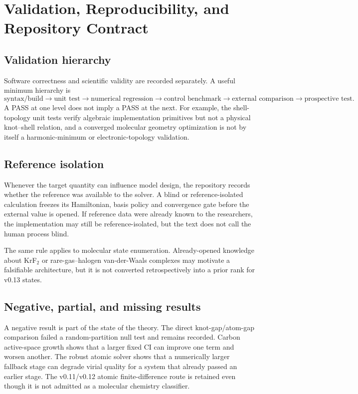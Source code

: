 \chapter{Validation, Reproducibility, and Repository Contract}
\label{app:validation}

\section{Validation hierarchy}
Software correctness and scientific validity are recorded separately.  A useful minimum hierarchy is
\begin{equation}
\text{syntax/build}\rightarrow\text{unit test}\rightarrow\text{numerical regression}\rightarrow\text{control benchmark}\rightarrow\text{external comparison}\rightarrow\text{prospective test}.
\end{equation}
A PASS at one level does not imply a PASS at the next.  For example, the shell-topology unit tests verify algebraic implementation primitives but not a physical knot--shell relation, and a converged molecular geometry optimization is not by itself a harmonic-minimum or electronic-topology validation.

\section{Reference isolation}
Whenever the target quantity can influence model design, the repository records whether the reference was available to the solver.  A blind or reference-isolated calculation freezes its Hamiltonian, basis policy and convergence gate before the external value is opened.  If reference data were already known to the researchers, the implementation may still be reference-isolated, but the text does not call the human process blind.

The same rule applies to molecular state enumeration.  Already-opened knowledge about KrF$_2$ or rare-gas--halogen van-der-Waals complexes may motivate a falsifiable architecture, but it is not converted retrospectively into a prior rank for v0.13 states.

\section{Negative, partial, and missing results}
A negative result is part of the state of the theory.  The direct knot-gap/atom-gap comparison failed a random-partition null test and remains recorded.  Carbon active-space growth shows that a larger fixed CI can improve one term and worsen another.  The robust atomic solver shows that a numerically larger fallback stage can degrade virial quality for a system that already passed an earlier stage.  The v0.11/v0.12 atomic finite-difference route is retained even though it is not admitted as a molecular chemistry classifier.

